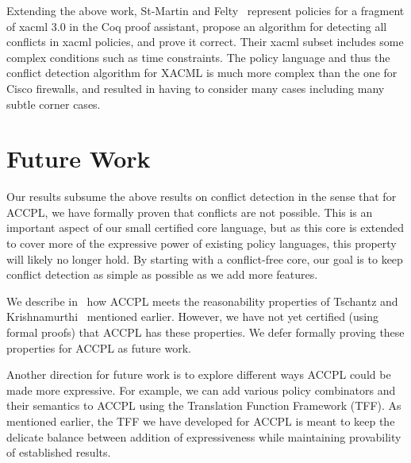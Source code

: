 \documentclass[conference]{IEEEtran}
\begin{document}
Extending the above work, St-Martin and Felty~\cite{felty16} represent
policies for a fragment of \ac{xacml} 3.0 in the Coq proof assistant,
propose an algorithm for detecting all conflicts in \ac{xacml}
policies, and prove it correct. Their \ac{xacml} subset includes some
complex conditions such as time constraints. The policy language and
thus the conflict detection algorithm for XACML is much more complex
than the one for Cisco firewalls, and resulted in having to consider
many cases including many subtle corner cases.

\section{Future Work}


Our results subsume the above results on conflict detection in the
sense that for \ac{ACCPL}, we have formally proven that conflicts are
not possible. This is an important aspect of our small certified core
language, but as this core is extended to cover more of the expressive
power of existing policy languages, this property will likely no
longer hold. By starting with a conflict-free core, our goal is to
keep conflict detection as simple as possible as we add more features.

We describe in~\cite{BahPhd} how \ac{ACCPL} meets the reasonability
properties of Tschantz and Krishnamurthi~\cite{Tschantz} mentioned
earlier.  However, we have not yet certified (using formal proofs)
that \ac{ACCPL} has these properties. We defer formally proving these
properties for \ac{ACCPL} as future work.

Another direction for future work is to explore different ways \ac{ACCPL} could be made more expressive. For example, we can add various policy combinators and their semantics to \ac{ACCPL} using the Translation Function Framework (TFF). As mentioned earlier, the TFF we have developed for \ac{ACCPL} is meant to keep the delicate balance between addition of expressiveness while maintaining provability of established results.
\end{document}
